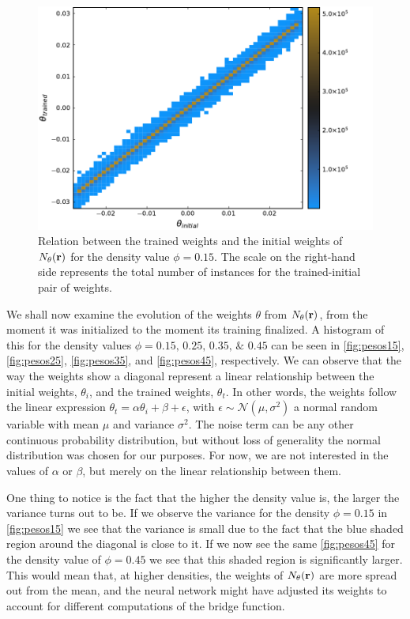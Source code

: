 \begin{figure}[t]
    \includegraphics[width=\textwidth]{figuras/capitulo-3/weights_phi=0.15.pdf}
    \caption[Comparison between weights, $\phi=0.15$.]{Relation between the trained weights and the initial weights of $N_{\theta}(\mathbf{r})$ for the density value $\phi=0.15$. The scale on the right-hand side represents the total number of instances for the trained-initial pair of weights.} 
    \label{fig:pesos15}
\end{figure}

We shall now examine the evolution of the weights $\theta$ from
$N_{\theta}(\mathbf{r})$, from the moment it was initialized to the moment its training finalized.
A histogram of this for the density values 
$\phi=\numlist[list-final-separator={\; \text{and} \;}]{0.15;0.25;0.35;0.45}$ 
can be seen in \autoref{fig:pesos15}, \autoref{fig:pesos25}, \autoref{fig:pesos35}, 
and \autoref{fig:pesos45}, respectively.
We can observe that the way the weights show a diagonal represent a linear relationship 
between the initial weights, $\theta_{i}$, and the trained weights, $\theta_{t}$. In other 
words, the weights follow the linear expression
$\theta_{t} = \alpha \theta_{i} + \beta + \epsilon$, with
$\epsilon \sim \mathcal{N}(\mu, \sigma^{2})$ a normal random variable with mean
$\mu$ and variance $\sigma^2$. The noise term can be any other continuous probability 
distribution, but without loss of generality the normal distribution was chosen for
our purposes. For now, we are not interested in the values of $\alpha$ or $\beta$,
but merely on the linear relationship between them.

One thing to notice is the fact that the higher the density value is, the larger
the variance turns out to be. If we observe the variance for the density
$\phi=0.15$ in \autoref{fig:pesos15}
we see that the variance is small due to the fact that the blue shaded region around
the diagonal is close to it. If we now see the same \autoref{fig:pesos45} for the 
density value of $\phi=0.45$ we see that this shaded region is significantly larger.
This would mean that, at higher densities, the weights of $N_{\theta}(\mathbf{r})$ are more spread out
from the mean, and the neural network might have adjusted its weights to account for
different computations of the bridge function.

